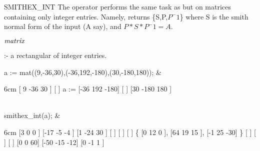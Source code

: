 \begin{Operator}[smithexint]{SMITHEX_INT}
The operator  performs the same task as 
but on matrices containing only integer entries. Namely, 
 returns \{S,P,$P^-1$\} where S is the smith normal
form of the input  (A say), and $P*S*P^-1 = A$.

\begin{Syntax}
\(\meta{matrix}\)

 :- a rectangular  of integer entries.
\end{Syntax}

\begin{Examples}
 a := mat((9,-36,30),(-36,192,-180),(30,-180,180)); &
\begin{multilineoutput}{6cm}
     [ 9   -36    30 ]
     [               ]
a := [-36  192   -180]
     [               ]
     [30   -180  180 ]
\end{multilineoutput}\\

 smithex_int(a); &
\begin{multilineoutput}{6cm}
  [3  0   0 ]    [-17  -5   -4 ]    [1   -24  30 ]
  [         ]    [             ]    [            ]
\{ [0  12  0 ],   [64   19   15 ],   [-1  25   -30] \}
  [         ]    [             ]    [            ] 
  [0  0   60]    [-50  -15  -12]    [0   -1    1 ] 
\end{multilineoutput}\\
\end{Examples}
\end{Operator}


